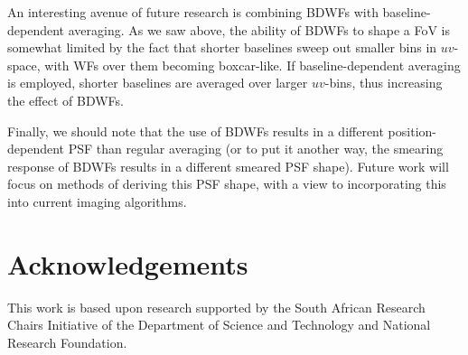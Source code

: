 \documentclass[useAMS,usenatbib]{mn2e}
\begin{document}
An interesting avenue of future research is combining BDWFs with baseline-dependent averaging. As we saw above, the ability
of BDWFs to shape a FoV is somewhat limited by the fact that shorter baselines sweep out smaller bins in $uv$-space, with 
WFs over them becoming boxcar-like. If baseline-dependent averaging is employed, shorter baselines are averaged over
larger $uv$-bins, thus increasing the effect of BDWFs. 

Finally, we should note that the use of BDWFs results in a different position-dependent PSF than regular averaging (or
to put it another way, the smearing response of BDWFs results in a different smeared PSF shape). Future work will focus
on methods of deriving this PSF shape, with a view to incorporating this into current imaging algorithms.


\section*{Acknowledgements}

This work is based upon research supported by the South African Research Chairs Initiative of the Department of 
Science and Technology and National Research Foundation.




\end{document}
